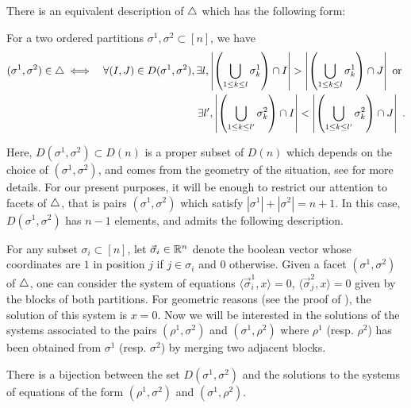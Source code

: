 There is an equivalent description of $\triangle$ which has the following form: 
\begin{proposition}[{\cite{LA21}}]
\label{p:minimal}
For a two ordered partitions $\sigma^1, \sigma^2 \subset [n]$, we have
\begin{eqnarray*}
    (\sigma^1,\sigma^2)\in \triangle 
    & \iff & \forall (I,J) \in D(\sigma^1,\sigma^2), \exists l , 
    \left| \left(\bigcup_{1\leq k \leq l} \sigma^1_{k} \right)\cap I \right|
    >
    \left| \left(\bigcup_{1\leq k \leq l} \sigma^1_{k} \right)\cap J \right| \text{ or } \\
    && \exists l' , 
    \left| \left(\bigcup_{1\leq k \leq l'} \sigma^2_{k} \right)\cap I \right|
    <
    \left| \left(\bigcup_{1\leq k \leq l'} \sigma^2_{k} \right)\cap J \right|  \ . 
\end{eqnarray*}
\end{proposition}
Here, $D(\sigma^1,\sigma^2) \subset D(n)$ is a proper subset of $D(n)$ which depends on the choice of $(\sigma^1,\sigma^2)$, and comes from the geometry of the situation, see \cite[Theorem 1.26]{LA21} for more details.
For our present purposes, it will be enough to restrict our attention to facets of $\triangle$, that is pairs $(\sigma^1,\sigma^2)$ which satisfy $|\sigma^1| + |\sigma^2|=n+1$.
In this case, $D(\sigma^1,\sigma^2)$ has $n-1$ elements, and admits the following description. 

For any subset $\sigma_i \subset [n]$, let $\vec \sigma_i \in \mathbb R^n$ denote the boolean vector whose coordinates are $1$ in position $j$ if $j \in \sigma_i$ and $0$ otherwise. 
Given a facet $(\sigma^1,\sigma^2)$ of $\triangle$, one can consider the system of equations $\langle \vec \sigma^1_i , x \rangle=0$, $\langle \vec \sigma^2_j , x \rangle=0$ given by the blocks of both partitions.
For geometric reasons (see the proof of \cite[Theorem 1.26]{LA21}), the solution of this system is $x=0$. 
Now we will be interested in the solutions of the systems associated to the pairs $(\rho^1,\sigma^2)$ and $(\sigma^1,\rho^2)$ where $\rho^1$ (resp. $\rho^2$) has been obtained from $\sigma^1$ (resp. $\sigma^2$) by merging two adjacent blocks.

\begin{proposition}
\label{p:minimal-IJ-pairs}
    There is a bijection between the set $D(\sigma^1,\sigma^2)$ and the solutions to the systems of equations of the form $(\rho^1,\sigma^2)$ and $(\sigma^1,\rho^2)$. 
\end{proposition}

